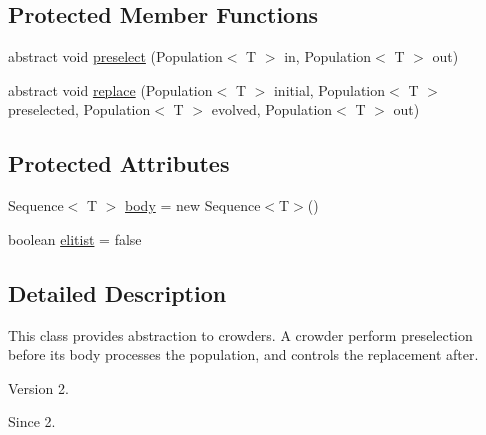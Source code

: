 \subsection*{Protected Member Functions}
\begin{DoxyCompactItemize}
\item 
abstract void \hyperlink{classjenes_1_1stage_1_1operator_1_1_crowder_3_01_t_01extends_01_chromosome_01_4_ae72da3620314eba33b17297eb6a52aa0}{preselect} (Population$<$ T $>$ in, Population$<$ T $>$ out)
\item 
abstract void \hyperlink{classjenes_1_1stage_1_1operator_1_1_crowder_3_01_t_01extends_01_chromosome_01_4_a2eec13cd60faaeefc6bb00302831740f}{replace} (Population$<$ T $>$ initial, Population$<$ T $>$ preselected, Population$<$ T $>$ evolved, Population$<$ T $>$ out)
\end{DoxyCompactItemize}
\subsection*{Protected Attributes}
\begin{DoxyCompactItemize}
\item 
Sequence$<$ T $>$ \hyperlink{classjenes_1_1stage_1_1operator_1_1_crowder_3_01_t_01extends_01_chromosome_01_4_a81522e76967039395a3567c866fa59ed}{body} = new Sequence$<$T$>$()
\item 
boolean \hyperlink{classjenes_1_1stage_1_1operator_1_1_crowder_3_01_t_01extends_01_chromosome_01_4_a5337bdf3f7d5ad8d6e09daaa3bb0636b}{elitist} = false
\end{DoxyCompactItemize}


\subsection{Detailed Description}
This class provides abstraction to crowders. A crowder perform preselection before its body processes the population, and controls the replacement after.

\begin{DoxyVersion}{Version}
2. 
\end{DoxyVersion}
\begin{DoxySince}{Since}
2. 
\end{DoxySince}


